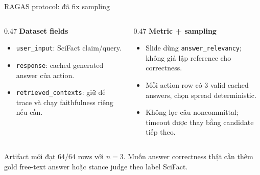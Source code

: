 \documentclass[aspectratio=169,10pt]{beamer}
\newcommand{\smallcode}[1]{\texttt{\scriptsize #1}}
\newcommand{\minihead}[1]{{\bfseries\color{AccentDark}#1}}
\newcommand{\takeaway}[1]{%
  \vspace{0.46em}
  \noindent\colorbox{Soft}{%
    \parbox{\dimexpr\linewidth-2\fboxsep}{\color{Ink}\strut #1\strut}%
  }%
}
\newenvironment{tightitemize}{\begin{itemize}\setlength{\itemsep}{0.22em}\setlength{\parskip}{0pt}}{\end{itemize}}
\begin{document}
\begin{frame}{RAGAS protocol: đã fix sampling}
  \small
  \begin{columns}[T,onlytextwidth]
    \begin{column}{0.47\textwidth}
      \minihead{Dataset fields}\\[-0.08cm]
      \begin{tightitemize}
        \item \smallcode{user\_input}: SciFact claim/query.
        \item \smallcode{response}: cached generated answer của action.
        \item \smallcode{retrieved\_contexts}: giữ để trace và chạy faithfulness riêng nếu cần.
      \end{tightitemize}
    \end{column}
    \begin{column}{0.47\textwidth}
      \minihead{Metric + sampling}\\[-0.08cm]
      \begin{tightitemize}
        \item Slide dùng \smallcode{answer\_relevancy}; không giả lập reference cho correctness.
        \item Mỗi action row có 3 valid cached answers, chọn spread deterministic.
        \item Không lọc câu noncommittal; timeout được thay bằng candidate tiếp theo.
      \end{tightitemize}
    \end{column}
  \end{columns}
  \takeaway{\small Artifact mới đạt 64/64 rows với \(n=3\). Muốn answer correctness thật cần thêm gold free-text answer hoặc stance judge theo label SciFact.}
\end{frame}
\end{document}
